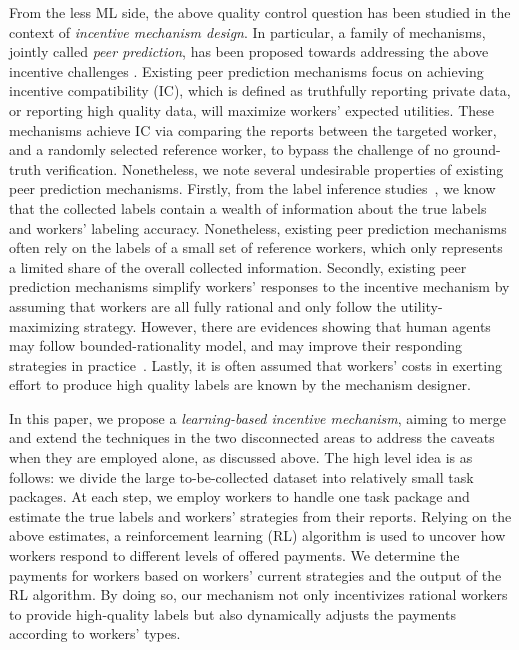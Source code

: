 From the less ML side, the above quality control question has been studied in the context of \emph{incentive mechanism design}. In particular, a family of mechanisms, jointly called \emph{peer prediction}, has been proposed towards addressing the above incentive challenges \cite{prelec2004bayesian,jurca2009mechanisms,witkowski2012peer,dasgupta2013crowdsourced}. Existing peer prediction mechanisms focus on achieving incentive compatibility (IC), which is defined as truthfully reporting private data, or reporting high quality data, will maximize workers' expected utilities. These mechanisms achieve IC via comparing the reports between the targeted worker, and a randomly selected reference worker, to bypass the challenge of no ground-truth verification.
Nonetheless, we note several undesirable properties of existing peer prediction mechanisms.
Firstly, from the label inference studies~\cite{zheng2017truth}, we know that the collected labels contain a wealth of information about the true labels and workers' labeling accuracy. Nonetheless, existing peer prediction mechanisms often rely on the labels of a small set of reference workers, which only represents a limited share of the overall collected information.
Secondly, existing peer prediction mechanisms simplify workers' responses to the incentive mechanism by assuming that workers are all fully rational and only follow the utility-maximizing strategy.
However, there are evidences showing that human agents may follow bounded-rationality model, and may improve their responding strategies in practice~\cite{simon1982models,chastain2014algorithms,gao2014trick}. Lastly, it is often assumed that workers' costs in exerting effort to produce high quality labels are known by the mechanism designer. 




In this paper, we propose a \emph{learning-based incentive mechanism}, aiming to merge and extend the techniques in the two disconnected areas to address the caveats when they are employed alone, as discussed above.
The high level idea is as follows: we divide the large to-be-collected dataset into relatively small task packages. At each step, we employ workers to handle one task package and estimate the true labels and workers' strategies from their reports.
Relying on the above estimates, a reinforcement learning (RL) algorithm is used to uncover how workers respond to different levels of offered payments.
We determine the payments for workers based on workers' current strategies and the output of the RL algorithm.
By doing so, our mechanism not only incentivizes rational workers to provide high-quality labels but also dynamically adjusts the payments according to workers' types.

